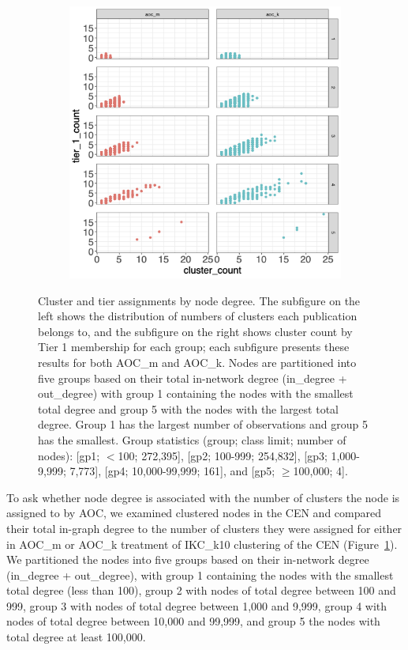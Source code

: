 \documentclass[12pt, oneside]{article}   	%
\begin{document}
{\begin{figure}
\begin{subfigure}[t]{0.48\textwidth}
\centering
\includegraphics[width=\linewidth]{tier_cluster.png} 
\end{subfigure}
\captionsetup{width=0.9\textwidth}	
\caption{Cluster and tier assignments by node degree. The subfigure on the left shows the distribution of numbers of clusters each publication belongs to, and the subfigure on the right shows cluster count by Tier 1 membership for each group; each subfigure presents these results for both AOC\_m and AOC\_k. Nodes are partitioned into five groups based on their total in-network degree (in\_degree + out\_degree) with group 1 containing the nodes with the smallest total degree and group 5 with the nodes with the largest total degree. Group 1 has the largest number of observations and group 5 has the smallest. Group statistics (group; class limit; number of nodes): [gp1; $<$100;  272,395], [gp2; 100-999; 254,832], [gp3; 1,000-9,999; 7,773], [gp4; 10,000-99,999; 161], and [gp5; $\geq$100,000; 4]. }
\label{fig:fig3}
\end{figure}
	
To ask whether node degree is associated with the number of clusters the node is assigned to by AOC, we examined clustered nodes in the CEN and compared their total in-graph degree to the number of clusters they were assigned for either in AOC\_m or AOC\_k treatment of IKC\_k10 clustering of the CEN (Figure~\ref{fig:fig3}). We partitioned the nodes into five groups based on their in-network degree (in\_degree + out\_degree),  with group 1 containing the nodes with the smallest total degree (less than 100), group 2 with nodes of total degree between 100 and 999, group 3 with nodes of total degree between 1,000 and 9,999, group 4 with nodes of total degree between 10,000 and 99,999, and group 5 the nodes with total degree at least 100,000.

}
\end{document}
